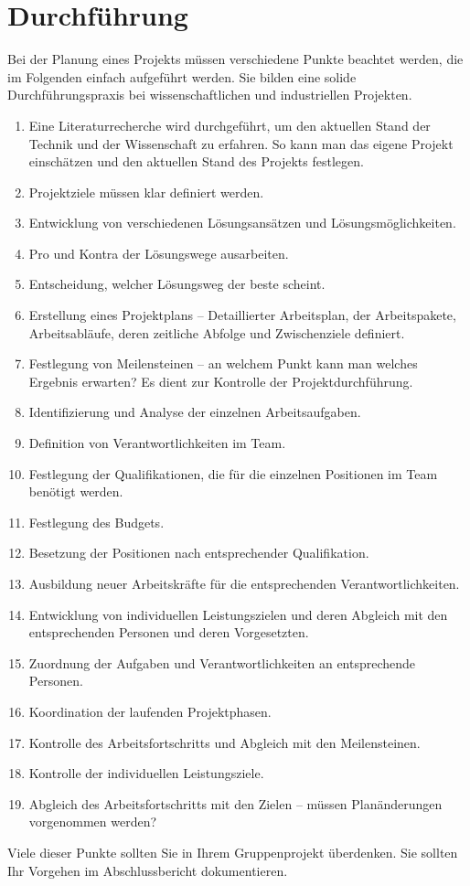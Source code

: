 \section{Durchführung}
Bei der Planung eines Projekts müssen verschiedene Punkte beachtet werden, die im Folgenden einfach aufgeführt werden. Sie bilden eine solide Durchführungspraxis bei wissenschaftlichen und industriellen Projekten.
\begin{enumerate}
\item Eine Literaturrecherche wird durchgeführt, um den aktuellen Stand der Technik und der Wissenschaft zu erfahren. So kann man das eigene Projekt einschätzen und den aktuellen Stand des Projekts festlegen.
\item Projektziele müssen klar definiert werden.
\item Entwicklung von verschiedenen Lösungsansätzen und Lösungsmöglichkeiten.
\item Pro und Kontra der Lösungswege ausarbeiten.
\item Entscheidung, welcher Lösungsweg der beste scheint.
\item Erstellung eines Projektplans -- Detaillierter Arbeitsplan, der Arbeitspakete, Arbeitsabläufe, deren zeitliche Abfolge und Zwischenziele definiert.
\item Festlegung von Meilensteinen -- an welchem Punkt kann man welches Ergebnis erwarten? Es dient zur Kontrolle der Projektdurchführung.
\item Identifizierung und Analyse der einzelnen Arbeitsaufgaben.
\item Definition von Verantwortlichkeiten im Team.
\item Festlegung der Qualifikationen, die für die einzelnen Positionen im Team benötigt werden.
\item Festlegung des Budgets.
\item Besetzung der Positionen nach entsprechender Qualifikation.
\item Ausbildung neuer Arbeitskräfte für die entsprechenden Verantwortlichkeiten.
\item Entwicklung von individuellen Leistungszielen und deren Abgleich mit den entsprechenden Personen und deren Vorgesetzten.
\item Zuordnung der Aufgaben und Verantwortlichkeiten an entsprechende Personen.
\item Koordination der laufenden Projektphasen.
\item Kontrolle des Arbeitsfortschritts und Abgleich mit den Meilensteinen.
\item Kontrolle der individuellen Leistungsziele.
\item Abgleich des Arbeitsfortschritts mit den Zielen -- müssen Planänderungen vorgenommen werden?
\end{enumerate}
Viele dieser Punkte sollten Sie in Ihrem Gruppenprojekt überdenken. Sie sollten Ihr
Vorgehen im Abschlussbericht dokumentieren.